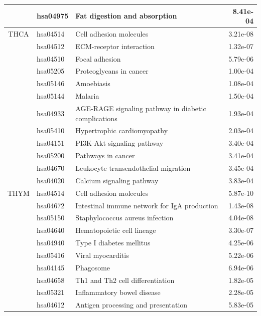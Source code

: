\begin{longtable}{cllr}
 & hsa04975 & \textcolor{\clrnew}{Fat digestion and absorption} & 8.41e-04 \\ 
\midrule 
THCA & hsa04514 & \textcolor{\clrnew}{Cell adhesion molecules} & 3.21e-08\\ 
 \rowcolor{\clrmatch}& hsa04512 & ECM-receptor interaction & 1.32e-07 \\ 
 \rowcolor{\clrmatch}& hsa04510 & Focal adhesion & 5.79e-06 \\ 
 & hsa05205 & \textcolor{\clrnew}{Proteoglycans in cancer} & 1.00e-04 \\ 
 & hsa05146 & \textcolor{\clrnew}{Amoebiasis} & 1.08e-04 \\ 
 & hsa05144 & \textcolor{\clrnew}{Malaria} & 1.50e-04 \\ 
 & hsa04933 & \textcolor{\clrnew}{AGE-RAGE signaling pathway in diabetic complications} & 1.93e-04 \\ 
 & hsa05410 & \textcolor{\clrnew}{Hypertrophic cardiomyopathy} & 2.03e-04 \\ 
 & hsa04151 & \textcolor{\clrnew}{PI3K-Akt signaling pathway} & 3.40e-04 \\ 
 & hsa05200 & \textcolor{\clrnew}{Pathways in cancer} & 3.41e-04 \\ 
 & hsa04670 & \textcolor{\clrnew}{Leukocyte transendothelial migration} & 3.45e-04 \\ 
 & hsa04020 & \textcolor{\clrnew}{Calcium signaling pathway} & 3.83e-04 \\ 
\midrule 
THYM & hsa04514 & \textcolor{\clrnew}{Cell adhesion molecules} & 5.87e-10\\ 
 & hsa04672 & \textcolor{\clrnew}{Intestinal immune network for IgA production} & 1.43e-08 \\ 
 & hsa05150 & \textcolor{\clrnew}{Staphylococcus aureus infection} & 4.04e-08 \\ 
 \rowcolor{\clrmatch}& hsa04640 & Hematopoietic cell lineage & 3.30e-07 \\ 
 & hsa04940 & \textcolor{\clrnew}{Type I diabetes mellitus} & 4.25e-06 \\ 
 & hsa05416 & \textcolor{\clrnew}{Viral myocarditis} & 5.22e-06 \\ 
 & hsa04145 & \textcolor{\clrnew}{Phagosome} & 6.94e-06 \\ 
 & hsa04658 & \textcolor{\clrnew}{Th1 and Th2 cell differentiation} & 1.82e-05 \\ 
 & hsa05321 & \textcolor{\clrnew}{Inflammatory bowel disease} & 2.28e-05 \\ 
 & hsa04612 & \textcolor{\clrnew}{Antigen processing and presentation} & 5.83e-05 \\ 

\end{longtable}
